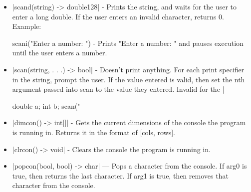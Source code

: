 \documentclass[12pt, letterpaper, oneside]{article}
\begin{document}
\begin{itemize}
		
		\begin{spverbatim}
			scani("Enter a number: ") - Prints "Enter a number: " and pauses execution until the user enters a number.
		\end{spverbatim}
		\item[--] \spverb|scand(string) -> double128| - Prints the string, and waits for the user to enter a long double. If the user enters an invalid character, returns 0. Example: 
		
		
		\begin{spverbatim}
			scani("Enter a number: ") - Prints "Enter a number: " and pauses execution until the user enters a number.
		\end{spverbatim}
		\item[--] \spverb|scan(string, . . .) -> bool| - Doesn't print anything. For each print specifier in the string, prompt the user. If the value entered is valid, then set the nth argument passed into scan to the value they entered. Invalid for the \spverb|%
		
		
		\begin{spverbatim}
			double a;
			int b;
			scan("%
		\end{spverbatim}
		\newline
		\item[--] \spverb|dimcon() -> int[]| - Gets the current dimensions of the console the program is running in. Returns it in the format of [cols, rows].
		\item[--] \spverb|clrcon() -> void| - Clears the console the program is running in.
		\item[--] \spverb|popcon(bool, bool) -> char| --- Pops a character from the console. If arg0 is true, then returns the last character. If arg1 is true, then removes that character from the console.
		\newpage
	\end{itemize}
\end{document}
